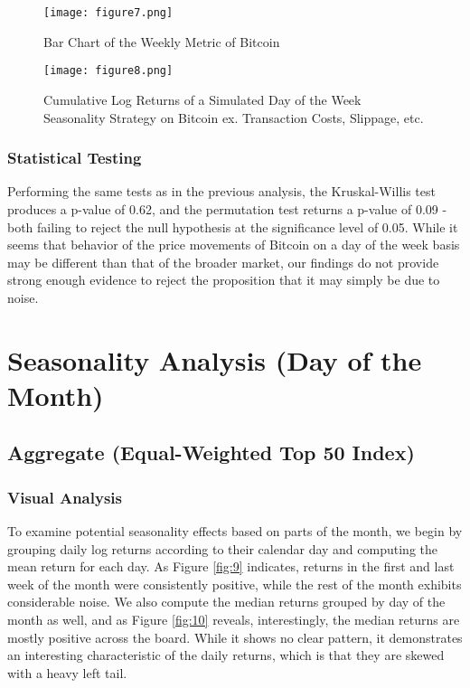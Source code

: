 \documentclass[
]{article}
\begin{document}
\begin{figure}[H]
    \centering
    \begin{minipage}{0.45\textwidth}
        \centering
        \texttt{[image: figure7.png]}
        \caption{Bar Chart of the Weekly Metric of Bitcoin}
        \label{fig:7}
    \end{minipage}
    \hfill
    \begin{minipage}{0.45\textwidth}
        \centering
        \texttt{[image: figure8.png]}
        \caption{Cumulative Log Returns of a Simulated Day of the Week Seasonality Strategy on Bitcoin ex. Transaction Costs, Slippage, etc.}
        \label{fig:8}
    \end{minipage}
\end{figure}

\subsubsection{Statistical Testing}\label{statistical-testing-1}

Performing the same tests as in the previous analysis, the
Kruskal-Willis test produces a p-value of 0.62, and the permutation test
returns a p-value of 0.09 - both failing to reject the null hypothesis
at the significance level of 0.05. While it seems that behavior of the
price movements of Bitcoin on a day of the week basis may be different
than that of the broader market, our findings do not provide strong
enough evidence to reject the proposition that it may simply be due to
noise.

\section{Seasonality Analysis (Day of the
Month)}\label{seasonality-analysis-day-of-the-month}

\subsection{Aggregate (Equal-Weighted Top 50
Index)}\label{aggregate-equal-weighted-top-50-index-1}

\subsubsection{Visual Analysis}\label{visual-analysis-2}

To examine potential seasonality effects based on parts of the month, we
begin by grouping daily log returns according to their calendar day and
computing the mean return for each day. As Figure
\textcolor{blue}{\ref{fig:9}} indicates, returns in the first and last
week of the month were consistently positive, while the rest of the
month exhibits considerable noise. We also compute the median returns
grouped by day of the month as well, and as Figure
\textcolor{blue}{\ref{fig:10}} reveals, interestingly, the median
returns are mostly positive across the board. While it shows no clear
pattern, it demonstrates an interesting characteristic of the daily
returns, which is that they are skewed with a heavy left tail.
\end{document}

